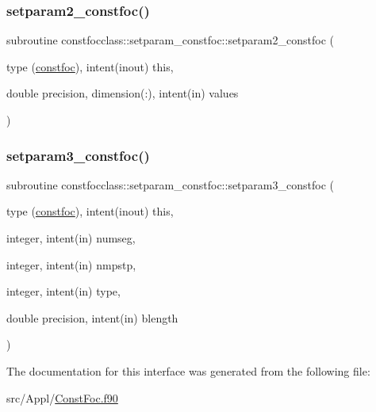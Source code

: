 \mbox{\label{interfaceconstfocclass_1_1setparam__constfoc_a57f09eab1784b8992915b3b7904904cf}} 
\subsubsection{\texorpdfstring{setparam2\_constfoc()}{setparam2\_constfoc()}}
{\footnotesize\ttfamily subroutine constfocclass\+::setparam\+\_\+constfoc\+::setparam2\+\_\+constfoc (\begin{DoxyParamCaption}\item[{type (\mbox{\hyperlink{namespaceconstfocclass_structconstfocclass_1_1constfoc}{constfoc}}), intent(inout)}]{this,  }\item[{double precision, dimension(\+:), intent(in)}]{values }\end{DoxyParamCaption})}

\mbox{\label{interfaceconstfocclass_1_1setparam__constfoc_a50c4bf308adab60563a469f3517a5b96}} 
\subsubsection{\texorpdfstring{setparam3\_constfoc()}{setparam3\_constfoc()}}
{\footnotesize\ttfamily subroutine constfocclass\+::setparam\+\_\+constfoc\+::setparam3\+\_\+constfoc (\begin{DoxyParamCaption}\item[{type (\mbox{\hyperlink{namespaceconstfocclass_structconstfocclass_1_1constfoc}{constfoc}}), intent(inout)}]{this,  }\item[{integer, intent(in)}]{numseg,  }\item[{integer, intent(in)}]{nmpstp,  }\item[{integer, intent(in)}]{type,  }\item[{double precision, intent(in)}]{blength }\end{DoxyParamCaption})}



The documentation for this interface was generated from the following file\+:\begin{DoxyCompactItemize}
\item 
src/\+Appl/\mbox{\hyperlink{_const_foc_8f90}{Const\+Foc.\+f90}}\end{DoxyCompactItemize}
